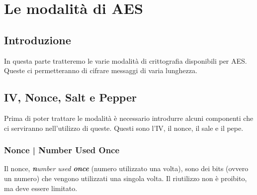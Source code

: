 
\chapter{Le modalità di AES}



\section{Introduzione}


\textsf{\small In questa parte tratteremo le varie modalità di crittografia disponibili per AES. Queste ci permetteranno di cifrare messaggi di varia lunghezza.} %


\section{IV, Nonce, Salt e Pepper} %

   

\textsf{\small Prima di poter trattare le modalità è necessario introdurre alcuni componenti che ci serviranno nell'utilizzo di queste. Questi sono l'IV, il nonce, il sale e il pepe.} %

\subsection{Nonce | Number Used Once}


\textsf{\small Il nonce, \emph{\textbf{n}umber used \textbf{once}} (numero utilizzato una volta), sono dei bits (ovvero un numero) che vengono utilizzati una singola volta. Il riutilizzo non è proibito, ma deve essere limitato.}

